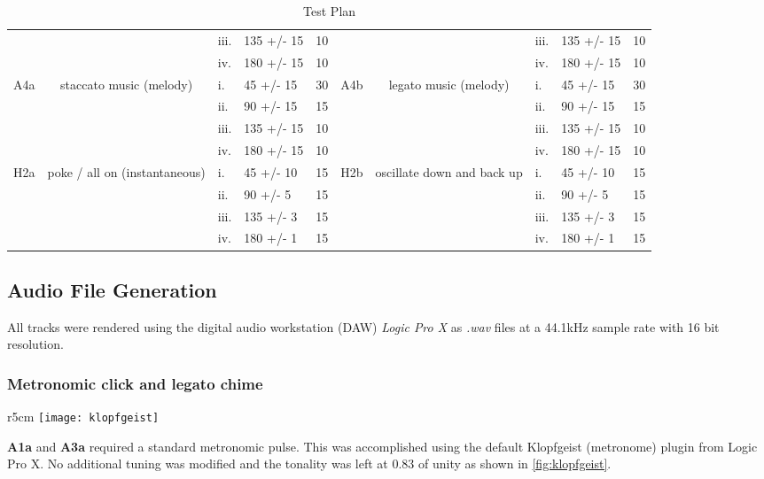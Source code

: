 \begin{table}[]
{\begin{tabular}{cclllcclll}
     &  & iii. & 135 +/- 15 & 10 &  &  & iii. & 135 +/- 15 & 10 \\
     &  & iv. & 180 +/- 15 & 10 &  &  & iv. & 180 +/- 15 & 10 \\
    \multirow{4}{*}{A4a} & \multirow{4}{*}{staccato music (melody)} & i. & 45 +/- 15 & 30 & \multirow{4}{*}{A4b} & \multirow{4}{*}{legato music (melody)} & i. & 45 +/- 15 & 30 \\
     &  & ii. & 90 +/- 15 & 15 &  &  & ii. & 90 +/- 15 & 15 \\
     &  & iii. & 135 +/- 15 & 10 &  &  & iii. & 135 +/- 15 & 10 \\
     &  & iv. & 180 +/- 15 & 10 &  &  & iv. & 180 +/- 15 & 10 \\
    \multirow{4}{*}{H2a} & \multirow{4}{*}{poke / all on (instantaneous)} & i. & 45 +/- 10 & 15 & \multirow{4}{*}{H2b} & \multirow{4}{*}{oscillate down and back up} & i. & 45 +/- 10 & 15 \\
     &  & ii. & 90 +/- 5 & 15 &  &  & ii. & 90 +/- 5 & 15 \\
     &  & iii. & 135 +/- 3 & 15 &  &  & iii. & 135 +/- 3 & 15 \\
     &  & iv. & 180 +/- 1 & 15 &  &  & iv. & 180 +/- 1 & 15
    \end{tabular}%
    }
    \caption{Test Plan}
    \label{fig:TestPlan}
\end{table}

\subsection{Audio File Generation}
All tracks were rendered using the digital audio workstation (DAW) \textit{Logic Pro X} as \textit{.wav} files at a 44.1kHz sample rate with 16 bit resolution.
\subsubsection{Metronomic click and legato chime}
\begin{wrapfigure}[8]{r}{5cm}
    \centering
    \texttt{[image: klopfgeist]}
    \caption{Default metronome}
    \label{fig:klopfgeist}
\end{wrapfigure}
\textbf{A1a} and \textbf{A3a} required a standard metronomic pulse. This was accomplished using the default Klopfgeist (metronome) plugin from Logic Pro X. No additional tuning was modified and the tonality was left at 0.83 of unity as shown in \ref{fig:klopfgeist}. 


